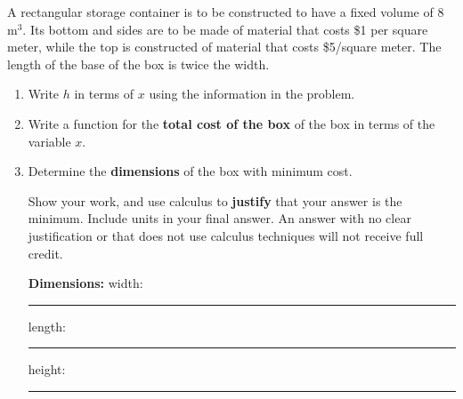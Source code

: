 \documentclass[12pt]{article}
\renewcommand{\emph}[1]{\textsf{\textbf{#1}}}
\newcommand{\blank}[1]{\rule{#1}{0.75pt}}
\newcounter{probcount}
\newcounter{subprobcount}
\def\problem#1{\setcounter{subprobcount}{0}%
\addtocounter{probcount}{1}{\emph{\arabic{probcount}.\hskip 1em(#1)}}\par}
\newenvironment{subproblems}{%
\begin{enumerate}%
\setcounter{enumi}{\value{subprobcount}}%
\renewcommand{\theenumi}{\emph{\alph{enumi}}}}%
{\setcounter{subprobcount}{\value{enumi}}\end{enumerate}}
\begin{document}
\newpage





\problem{12 points} 
\begin{minipage}[b]{.6\linewidth}
A rectangular storage container is to be constructed to have a fixed volume of 8 $\mathrm{m}^{3}$. Its bottom and sides are to be made of material that costs \$1 per square meter, while the top is constructed of material that costs \$5/square meter. The length of the base of the box is twice the width.
\end{minipage}
%
\hfill
%
\begin{minipage}{.2\linewidth}
\def\r{.4}
\end{minipage}

\begin{subproblems}
\item Write $h$ in terms of $x$ using the information in the problem.
\vspace{2cm}
\item Write a function for the \emph{total cost of the box} of the box in terms of the variable $x$.
\vspace{2cm}
\item %
Determine the \emph{dimensions} of the box with minimum cost.

Show your work, and use calculus to \emph{justify} that your answer is the minimum. Include units in your final answer. An answer with no clear justification or that does not use calculus techniques will not receive full credit.

\vfill

\vfill

\vfill

\emph{Dimensions:} width: \blank{1in} length: \blank{1in} height: \blank{1in}

\end{subproblems}
\end{document}
